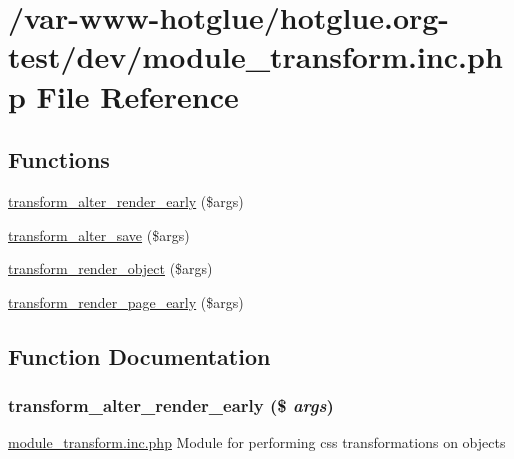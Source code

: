 \hypertarget{module__transform_8inc_8php}{
\section{/var-\/www-\/hotglue/hotglue.org-\/test/dev/module\_\-transform.inc.php File Reference}
\label{module__transform_8inc_8php}
}
\subsection*{Functions}
\begin{DoxyCompactItemize}
\item 
\hyperlink{module__transform_8inc_8php_a75e82d44d60250d86fed6b3618d66369}{transform\_\-alter\_\-render\_\-early} (\$args)
\item 
\hyperlink{module__transform_8inc_8php_a3a3d726aef41e0bc7b2801adffa36bf8}{transform\_\-alter\_\-save} (\$args)
\item 
\hyperlink{module__transform_8inc_8php_ab188b6fd81671c7a8d13db5c437ce8c2}{transform\_\-render\_\-object} (\$args)
\item 
\hyperlink{module__transform_8inc_8php_ab7e13589fab3f7511bdfe49559697d14}{transform\_\-render\_\-page\_\-early} (\$args)
\end{DoxyCompactItemize}


\subsection{Function Documentation}
\hypertarget{module__transform_8inc_8php_a75e82d44d60250d86fed6b3618d66369}{
\subsubsection[{transform\_\-alter\_\-render\_\-early}]{\setlength{\rightskip}{0pt plus 5cm}transform\_\-alter\_\-render\_\-early (\$ {\em args})}}
\label{module__transform_8inc_8php_a75e82d44d60250d86fed6b3618d66369}
\hyperlink{module__transform_8inc_8php}{module\_\-transform.inc.php} Module for performing css transformations on objects

